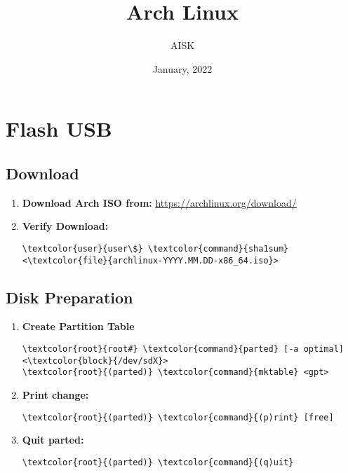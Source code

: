 \documentclass[10pt, a4paper, onecolumn, openany]{book} %
\title{\textbf{Arch Linux}}
\author{AISK}
\date{January, 2022}
\begin{document}
\maketitle
\tableofcontents

\chapter{Flash USB}
\section{Download}
\begin{enumerate}
    \item \textbf{Download Arch ISO from:}
\newline \underline{\href{https://archlinux.org/download/}{https://archlinux.org/download/}}
    \item \textbf{Verify Download:}
\begin{Verbatim}[commandchars=\\\{\}]
\textcolor{user}{user\$} \textcolor{command}{sha1sum} <\textcolor{file}{archlinux-YYYY.MM.DD-x86_64.iso}>
\end{Verbatim}
\end{enumerate}
\section{Disk Preparation}
\begin{enumerate}
    \item \textbf{Create Partition Table}
\begin{Verbatim}[commandchars=\\\{\}]
\textcolor{root}{root#} \textcolor{command}{parted} [-a optimal] <\textcolor{block}{/dev/sdX}>
\textcolor{root}{(parted)} \textcolor{command}{mktable} <gpt>
\end{Verbatim}
    \item \textbf{Print change:}
\begin{Verbatim}[commandchars=\\\{\}]
\textcolor{root}{(parted)} \textcolor{command}{(p)rint} [free]
\end{Verbatim}
    \item \textbf{Quit parted:}
\begin{Verbatim}[commandchars=\\\{\}]
\textcolor{root}{(parted)} \textcolor{command}{(q)uit}
\end{Verbatim}
\end{enumerate}
\end{document}

